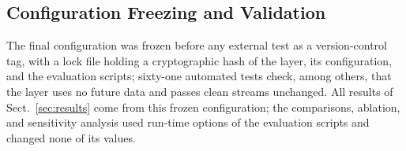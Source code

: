 \subsection{Configuration Freezing and Validation}\label{sec:freeze}
The final configuration was frozen before any external test as a version-control tag, with a lock
file holding a cryptographic hash of the layer, its configuration, and the evaluation scripts;
sixty-one automated tests check, among others, that the layer uses no future data and passes clean
streams unchanged. All results of Sect.~\ref{sec:results} come from this frozen configuration; the
comparisons, ablation, and sensitivity analysis used run-time options of the evaluation scripts and
changed none of its values.
